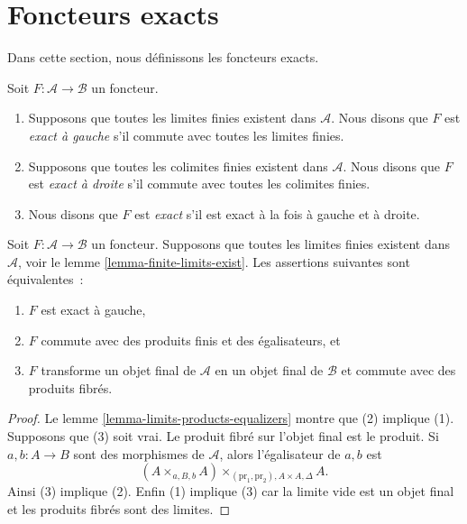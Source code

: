 \section{Foncteurs exacts}
\label{section-exact-functor}

\noindent
Dans cette section, nous définissons les foncteurs exacts.

\begin{definition}
\label{definition-exact}
Soit $F : \mathcal{A} \to \mathcal{B}$ un foncteur.
\begin{enumerate}
\item Supposons que toutes les limites finies existent dans $\mathcal{A}$.
Nous disons que $F$ est {\it exact à gauche} s'il commute avec toutes
les limites finies.
\item Supposons que toutes les colimites finies existent dans $\mathcal{A}$.
Nous disons que $F$ est {\it exact à droite} s'il commute avec toutes les
colimites finies.
\item Nous disons que $F$ est {\it exact} s'il est exact à la fois à gauche et
à droite.
\end{enumerate}
\end{definition}

\begin{lemma}
\label{lemma-characterize-left-exact}
Soit $F : \mathcal{A} \to \mathcal{B}$ un foncteur. Supposons que toutes les
limites finies existent dans $\mathcal{A}$, voir le lemme
\ref{lemma-finite-limits-exist}. Les assertions suivantes sont équivalentes :
\begin{enumerate}
\item $F$ est exact à gauche,
\item $F$ commute avec des produits finis et des égalisateurs, et
\item $F$ transforme un objet final de $\mathcal{A}$ en un objet final de
$\mathcal{B}$ et commute avec des produits fibrés.
\end{enumerate}
\end{lemma}

\begin{proof}
Le lemme \ref{lemma-limits-products-equalizers} montre que (2) implique (1).
Supposons que (3) soit vrai. Le produit fibré sur l'objet final est le
produit. Si $a, b : A \to B$ sont des morphismes de $\mathcal{A}$, alors
l'égalisateur de $a, b$ est
$$
(A \times_{a, B, b} A)\times_{(\text{pr}_1, \text{pr}_2), A \times A, \Delta} A.
$$
Ainsi (3) implique (2). Enfin (1) implique (3) car la limite vide est un objet
final et les produits fibrés sont des limites.
\end{proof}

